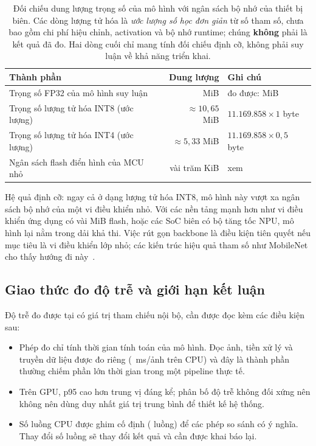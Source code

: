 \begin{table}[htbp]
  \centering
  \small
  \begin{tabular}{@{}l r l@{}}
    \toprule
    Thành phần & Dung lượng & Ghi chú \\
    \midrule
    Trọng số FP32 của mô hình suy luận & \RParamInferenceMiB{} MiB & đo được: \RParamInferenceFileMiB{} MiB \\
    Trọng số lượng tử hóa INT8 (ước lượng) & $\approx 10{,}65$ MiB & $11.169.858 \times 1$ byte \\
    Trọng số lượng tử hóa INT4 (ước lượng) & $\approx 5{,}33$ MiB & $11.169.858 \times 0{,}5$ byte \\
    \midrule
    Ngân sách flash điển hình của MCU nhỏ & vài trăm KiB & xem \cite{lin2019mcunet} \\
    \bottomrule
  \end{tabular}
  \caption{Đối chiếu dung lượng trọng số của mô hình với ngân sách bộ nhớ của thiết bị biên. Các
  dòng lượng tử hóa là \emph{ước lượng số học đơn giản} từ số tham số, chưa bao gồm chi phí
  hiệu chỉnh, activation và bộ nhớ runtime; chúng \textbf{không} phải là kết quả đã đo. Hai dòng
  cuối chỉ mang tính đối chiếu định cỡ, không phải suy luận về khả năng triển khai.}
  \label{tab:iot-budget}
\end{table}

Hệ quả định cỡ: ngay cả ở dạng lượng tử hóa INT8, mô hình này vượt xa ngân sách bộ nhớ của một
vi điều khiển nhỏ. Với các nền tảng mạnh hơn như vi điều khiển ứng dụng có vài MiB flash, hoặc
các SoC biên có bộ tăng tốc NPU, mô hình lại nằm trong dải khả thi. Việc rút gọn backbone là
điều kiện tiên quyết nếu mục tiêu là vi điều khiển lớp nhỏ; các kiến trúc hiệu quả tham số như
MobileNet cho thấy hướng đi này~\cite{howard2017mobilenets}.

\subsection{Giao thức đo độ trễ và giới hạn kết luận}
\label{sec:iot-latency}

Độ trễ đo được tại  có giá trị tham chiếu nội bộ, cần được đọc kèm các điều
kiện sau:

\begin{itemize}[leftmargin=1.2cm,itemsep=3pt]
  \item Phép đo chỉ tính thời gian tính toán của mô hình. Đọc ảnh, tiền xử lý và truyền dữ liệu
        được đo riêng (\RPreprocessMs{}~ms/ảnh trên CPU) và đây là thành phần thường chiếm phần
        lớn thời gian trong một pipeline thực tế.
  \item Trên GPU, p95 cao hơn trung vị đáng kể; phân bố độ trễ không đối xứng nên không nên
        dùng duy nhất giá trị trung bình để thiết kế hệ thống.
  \item Số luồng CPU được ghim cố định (\RLatThreads{} luồng) để các phép so sánh có ý nghĩa.
        Thay đổi số luồng sẽ thay đổi kết quả và cần được khai báo lại.
\end{itemize}

